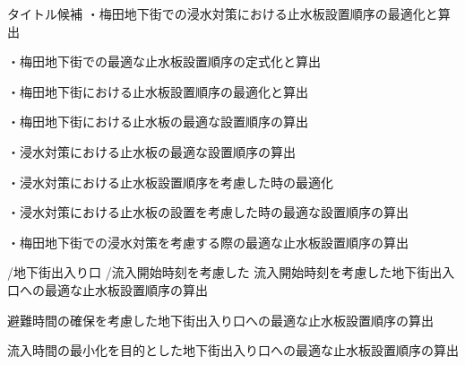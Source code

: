 タイトル候補
・梅田地下街での浸水対策における止水板設置順序の最適化と算出

・梅田地下街での最適な止水板設置順序の定式化と算出

・梅田地下街における止水板設置順序の最適化と算出

・梅田地下街における止水板の最適な設置順序の算出

・浸水対策における止水板の最適な設置順序の算出

・浸水対策における止水板設置順序を考慮した時の最適化

・浸水対策における止水板の設置を考慮した時の最適な設置順序の算出

・梅田地下街での浸水対策を考慮する際の最適な止水板設置順序の算出

/地下街出入り口
/流入開始時刻を考慮した
流入開始時刻を考慮した地下街出入口への最適な止水板設置順序の算出

避難時間の確保を考慮した地下街出入り口への最適な止水板設置順序の算出

流入時間の最小化を目的とした地下街出入り口への最適な止水板設置順序の算出


